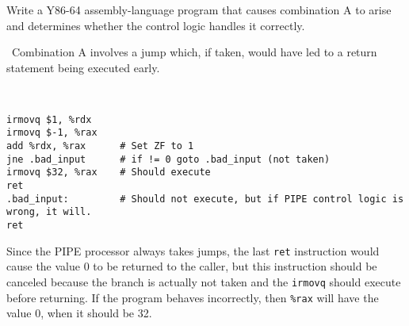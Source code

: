 \documentclass[12pt]{article}
\newenvironment{ex}[2][Exercise]{\begin{trivlist}
		\item[\hskip \labelsep {\bfseries #1}\hskip \labelsep {\bfseries #2.}]}{\end{trivlist}}
\newenvironment{sol}[1][Solution]{\begin{trivlist}
		\item[\hskip \labelsep {\bfseries #1:}]}{\end{trivlist}}
\begin{document}
\begin{ex}{4.37}
	Write a Y86-64 assembly-language program that causes combination A to arise and determines
	whether the control logic handles it correctly.
\end{ex}

\begin{sol}
	\
	Combination A involves a jump which, if taken, would have led to a return statement
	being executed early.
	\begin{lstlisting}[language={}]


irmovq $1, %rdx
irmovq $-1, %rax
add %rdx, %rax		# Set ZF to 1
jne .bad_input		# if != 0 goto .bad_input (not taken)
irmovq $32, %rax	# Should execute
ret
.bad_input:			# Should not execute, but if PIPE control logic is wrong, it will.
ret
	\end{lstlisting}
	Since the PIPE processor always takes jumps, the last \texttt{ret} instruction would cause
	the value 0 to be returned to the caller, but this instruction should be canceled
	because the branch is actually not taken and the \texttt{irmovq} should execute
	before returning. If the program behaves incorrectly, then \texttt{\%rax} will
	have the value 0, when it should be 32.
\end{sol}
\end{document}

